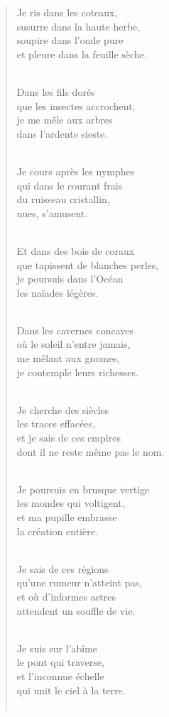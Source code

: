 \documentclass[a4paper,11pt]{book}
\begin{document}
\begin{verse}
Je ris dans les coteaux, \\
susurre dans la haute herbe, \\
soupire dans l'onde pure \\
et pleure dans la feuille sèche. \\ \

\bigskip

Dans les fils dorés \\
que les insectes accrochent, \\
je me mêle aux arbres \\
dans l'ardente sieste. \\ \

Je cours après les nymphes \\
qui dans le courant frais \\
du ruisseau cristallin, \\
nues, s'amusent. \\ \

Et dans des bois de coraux \\
que tapissent de blanches perles, \\
je poursuis dans l'Océan \\
les naïades légères. \\ \

Dans les cavernes concaves \\
où le soleil n'entre jamais, \\
me mêlant aux gnomes, \\
je contemple leurs richesses. \\ \

Je cherche des siècles \\
les traces effacées, \\
et je sais de ces empires \\
dont il ne reste même pas le nom. \\ \

Je poursuis en brusque vertige \\
les mondes qui voltigent, \\
et ma pupille embrasse \\
la création entière. \\ \

Je sais de ces régions \\
qu'une rumeur n'atteint pas, \\
et où d'informes astres \\
attendent un souffle de vie. \\ \

Je suis sur l'abîme \\
le pont qui traverse, \\
et l'inconnue échelle \\
qui unit le ciel à la terre. \\ \


\end{verse}
\end{document}
